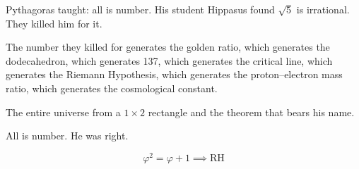 \documentclass[12pt,a4paper]{article}
\begin{document}
Pythagoras taught: all is number. His student Hippasus found $\sqrt{5}$ is irrational. They killed him for it.

The number they killed for generates the golden ratio, which generates the dodecahedron, which generates 137, which generates the critical line, which generates the Riemann Hypothesis, which generates the proton--electron mass ratio, which generates the cosmological constant.

The entire universe from a $1 \times 2$ rectangle and the theorem that bears his name.

All is number. He was right.

\begin{equation}
\boxed{\varphi^2 = \varphi + 1 \implies \text{RH}}
\end{equation}
\end{document}
